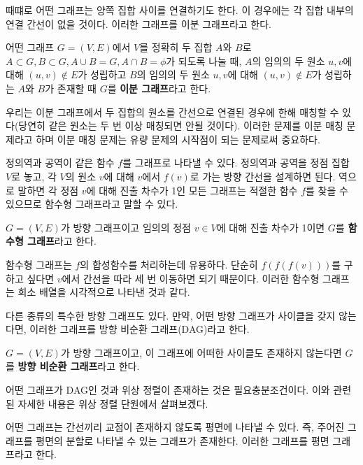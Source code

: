 때떄로 어떤 그래프는 양쪽 집합 사이를 연결하기도 한다. 이 경우에는 각 집합 내부의 연결 간선이 없을 것이다. 이러한 그래프를 이분 그래프라고 한다.

\begin{definition}[이분 그래프]
    어떤 그래프 $G=(V, E)$에서 $V$를 정확히 두 집합 $A$와 $B$로 $A \subset G, B \subset G, A \cup B=G, A \cap B = \phi$가 되도록 나눌 때, $A$의 임의의 두 원소 $u, v$에 대해 $(u, v) \notin E$가 성립하고 $B$의 임의의 두 원소 $u, v$에 대해 $(u, v) \notin E$가 성립하는 $A$와 $B$가 존재할 때 $G$를 \textbf{이분 그래프}라고 한다.
\end{definition}

우리는 이분 그래프에서 두 집합의 원소를 간선으로 연결된 경우에 한해 매칭할 수 있다(당연히 같은 원소는 두 번 이상 매칭되면 안될 것이다). 이러한 문제를 이분 매칭 문제라고 하며 이분 매칭 문제는 유량 문제의 시작점이 되는 문제로써 중요하다.

정의역과 공역이 같은 함수 $f$를 그래프로 나타낼 수 있다. 정의역과 공역을 정점 집합 $V$로 놓고, 각 $V$의 원소 $v$에 대해 $v$에서 $f(v)$로 가는 방향 간선을 설계하면 된다. 역으로 말하면 각 정점 $v$에 대해 진출 차수가 1인 모든 그래프는 적절한 함수 $f$를 찾을 수 있으므로 함수형 그래프라고 말할 수 있다.

\begin{definition}
    $G=(V, E)$가 방향 그래프이고 임의의 정점 $v \in V$에 대해 진출 차수가 1이면 $G$를 \textbf{함수형 그래프}라고 한다.
\end{definition}

함수형 그래프는 $f$의 합성함수를 처리하는데 유용하다. 단순히 $f(f(f(v)))$를 구하고 싶다면 $v$에서 간선을 따라 세 번 이동하면 되기 때문이다. 이러한 함수형 그래프는 희소 배열을 시각적으로 나타낸 것과 같다.

다른 종류의 특수한 방향 그래프도 있다. 만약, 어떤 방향 그래프가 사이클을 갖지 않는다면, 이러한 그래프를 방향 비순환 그래프(DAG)라고 한다. 

\begin{definition}
    $G=(V, E)$가 방향 그래프이고, 이 그래프에 어떠한 사이클도 존재하지 않는다면 $G$를 \textbf{방향 비순환 그래프}라고 한다.
\end{definition}

어떤 그래프가 DAG인 것과 위상 정렬이 존재하는 것은 필요충분조건이다. 이와 관련된 자세한 내용은 위상 정렬 단원에서 살펴보겠다.

어떤 그래프는 간선끼리 교점이 존재하지 않도록 평면에 나타낼 수 있다. 즉, 주어진 그래프를 평면의 분할로 나타낼 수 있는 그래프가 존재한다. 이러한 그래프를 평면 그래프라고 한다.

